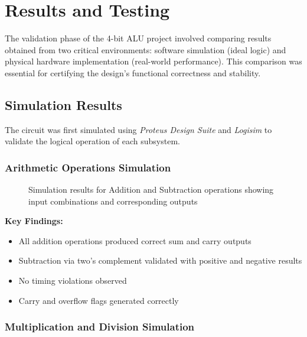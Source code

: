 \chapter{Results and Testing}

The validation phase of the 4-bit ALU project involved comparing results obtained from two critical environments: software simulation (ideal logic) and physical hardware implementation (real-world performance). This comparison was essential for certifying the design's functional correctness and stability.

\section{Simulation Results}

The circuit was first simulated using \textit{Proteus Design Suite} and \textit{Logisim} to validate the logical operation of each subsystem.

\subsection{Arithmetic Operations Simulation}

\begin{figure}[h]
    \centering
    \caption{Simulation results for Addition and Subtraction operations showing input combinations and corresponding outputs}
    \label{fig:sim-arithmetic}
\end{figure}

\textbf{Key Findings:}
\begin{itemize}
    \item All addition operations produced correct sum and carry outputs
    \item Subtraction via two's complement validated with positive and negative results
    \item No timing violations observed
    \item Carry and overflow flags generated correctly
\end{itemize}

\subsection{Multiplication and Division Simulation}

